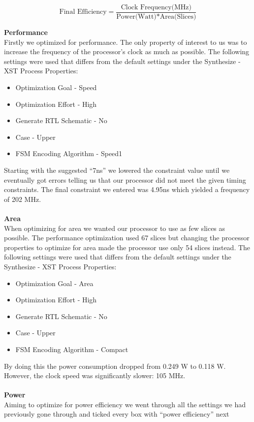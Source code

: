 \documentclass[a4paper,11pt]{article}
\begin{document}
$$ \text{Final Efficiency} = 
\frac{\text{Clock Frequency(MHz)}}{\text{Power(Watt)*Area(Slices)}}$$

\noindent
{\bf Performance}\\
\noindent
Firstly we optimized for performance. The only property of interest to us was 
to increase the frequency of the processor's clock as much as possible. The 
following settings were used that differs from the default settings under the 
Synthesize - XST Process Properties:
\noindent
\begin{itemize}
\item Optimization Goal - Speed
\item Optimization Effort - High
\item Generate RTL Schematic - No
\item Case - Upper
\item FSM Encoding Algorithm - Speed1
\end{itemize}
\noindent
Starting with the suggested ``7ns'' we lowered the constraint value until we 
eventually got errors telling us that our processor did not meet the given 
timing constraints. The final constraint we entered was 4.95ns which yielded 
a frequency of 202 MHz.\\\\
\noindent
{\bf Area}\\
\noindent
When optimizing for area we wanted our processor to use as few slices as 
possible. The performance optimization used 67 slices but changing the 
processor properties to optimize for area made the processor use only 54 
slices instead. The following settings were used that differs from the 
default settings under the Synthesize - XST Process Properties:
\noindent
\begin{itemize}
\item Optimization Goal - Area
\item Optimization Effort - High
\item Generate RTL Schematic - No
\item Case - Upper
\item FSM Encoding Algorithm - Compact
\end{itemize}
\noindent
By doing this the power consumption dropped from 0.249 W to 0.118 W. 
However, the clock speed was significantly slower: 105 MHz.\\\\
\noindent
{\bf Power}\\
\noindent
Aiming to optimize for power efficiency we went through all the settings we 
had previously gone through and ticked every box with ``power efficiency'' next 
\end{document}
